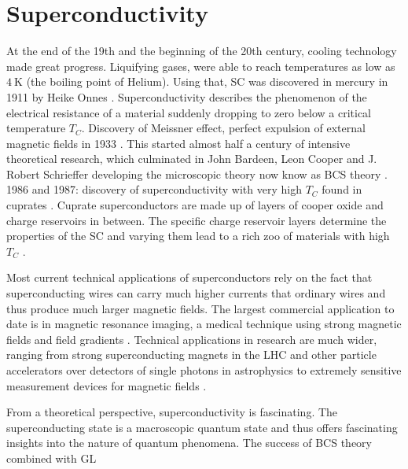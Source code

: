 \documentclass[../notes.tex]{subfiles}
\begin{document}
\chapter{Superconductivity}

At the end of the 19th and the beginning of the 20th century, cooling technology made great progress.
Liquifying gases, were able to reach temperatures as low as \(\qty{4}{\kelvin}\) (the boiling point of Helium).
Using that, SC was discovered in mercury in 1911 by Heike Onnes \cite{onnesFurtherExperimentsLiquid1991}.
Superconductivity describes the phenomenon of the electrical resistance of a material suddenly dropping to zero below a critical temperature \(T_C\).
Discovery of Meissner effect, perfect expulsion of external magnetic fields in 1933 \cite{meissnerNeuerEffektBei1933}.
This started almost half a century of intensive theoretical research, which culminated in John Bardeen, Leon Cooper and J. Robert Schrieffer developing the microscopic theory now know as BCS theory \cite{bardeenTheorySuperconductivity1957}.
1986 and 1987: discovery of superconductivity with very high \(T_C\) found in cuprates \cite{bednorzPossibleHighTc1986,uchidaHighTcSuperconductivity1987}.
Cuprate superconductors are made up of layers of cooper oxide and charge reservoirs in between.
The specific charge reservoir layers determine the properties of the SC and varying them lead to a rich zoo of materials with high \(T_C\)  \cite{rybickiPerspectivePhaseDiagram2016}.

Most current technical applications of superconductors rely on the fact that superconducting wires can carry much higher currents that ordinary wires and thus produce much larger magnetic fields.
The largest commercial application to date is in magnetic resonance imaging, a medical technique using strong magnetic fields and field gradients \cite{rinckMagneticResonanceMedicine}.
Technical applications in research are much wider, ranging from strong superconducting magnets in the LHC \cite{tollestrupDevelopmentSuperconductingMagnets2008} and other particle accelerators over detectors of single photons in astrophysics \cite{irwinTransitionEdgeSensors2005} to extremely sensitive measurement devices for magnetic fields \cite{koelleHightransitiontemperatureSuperconductingQuantum1999, faleyHighTcSQUIDBiomagnetometers2017}.

From a theoretical perspective, superconductivity is fascinating.
The superconducting state is a macroscopic quantum state and thus offers fascinating insights into the nature of quantum phenomena.
The success of BCS theory combined with GL 
\end{document}

